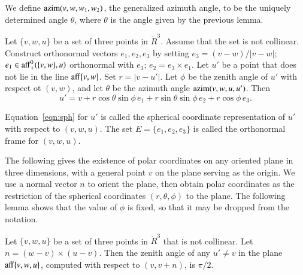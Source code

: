 \begin{definition}[azim] 
We define ${\operatorname{azim}}(v,w,w_1,w_2)$, the generalized azimuth angle, 
to be the uniquely determined
angle $\theta$, where $\theta$ is the angle given by the previous
lemma.
\end{definition}

\begin{lemma}\label{lemma:sph}
Let $\{v,w,u\}$ be a set of three points in $\ring{R}^3$.
Assume that the set is not collinear.  
Construct orthonormal vectors  $e_1,e_2,e_3$ by setting
$e_3 = (v-w)/|v-w|$; 
$e_1\in{\operatorname{aff}}_+^0(\{v,w\},u)$ orthonormal with $e_3$;
$e_2 = e_3\times e_1$.
Let $u'$ be a point that does not
lie in the line ${\operatorname{aff}}\{v,w\}$.
Set $r = |v - u'|$. Let
$\phi$ be the zenith angle of $u'$ with respect ot $(v,w)$, and let
$\theta$ be the azimuth angle ${\operatorname{azim}}(v,w,u,u')$.  Then
   \begin{equation}
   u' = v + r \cos\theta \sin\phi\, e_1 + r \sin\theta\sin\phi\, e_2 +
   r\cos\phi\,e_3.
   \label{eqn:sph}
   \end{equation}
\end{lemma}

\begin{definition}[frame]\label{def:sph}
Equation~\ref{eqn:sph} for
$u'$ is called the spherical coordinate representation of
$u'$ with respect to $(v,w,u)$.  The set $E=\{e_1,e_2,e_3\}$ is called
the orthonormal frame for $(v,w,u)$.  
\end{definition}

The following gives the existence of polar coordinates on any oriented
plane in three dimensions, with a general point $v$ on the plane
serving as the origin.  We use a normal vector $n$ to orient the plane,
then obtain polar coordinates as the restriction of the
spherical coordinates $(r,\theta,\phi)$ to the plane.
The following lemma shows that the value of $\phi$ is fixed, so that
it may be dropped from the notation.

\begin{lemma}\label{lemma:polar-gen}
Let $\{v,w,u\}$ be a set of three points in $\ring{R}^3$
that is not collinear.
Let $n = (w-v) \times (u-v)$.
Then the zenith angle of any $u'\ne v$ in the plane ${\operatorname{aff}}\{v,w,u\}$,
computed with respect to $(v,v+n)$,
is $\pi/2$.
\end{lemma}

